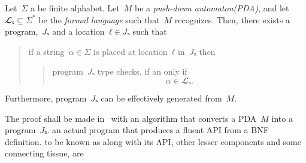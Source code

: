 \begin{Theorem}
\label{Theorem:Gil-Levy}
Let~$Σ$ a be finite alphabet.
Let~$M$ be a \emph{push-down automaton(PDA)}, and let~$𝓛ₛ⊆Σ^*$ be
the \emph{formal language} such that~$M$ recognizes.
Then, there exists a \Java program,~$Jₛ$ and a location~$ℓ∈Jₛ$
such that
\begin{quote}
  if a string~$α∈Σ$ is
  placed at location~$ℓ$ in~$Jₛ$ then
  \begin{quote}
    program~$Jₛ$ type checks, if an only if
    \[
      α∈𝓛ₛ.
    \]
  \end{quote}
\end{quote}
Furthermore, program~$Jₛ$ can be effectively generated from~$M$.
\end{Theorem}

The proof shall be made in~ with an algorithm that converts a
  PDA~$M$ into a program~$Jₛ$.
  an actual program that produces a fluent API from a BNF definition.
  to be known as 
  along with its API, other lesser components and
  some connecting tissue, are 

